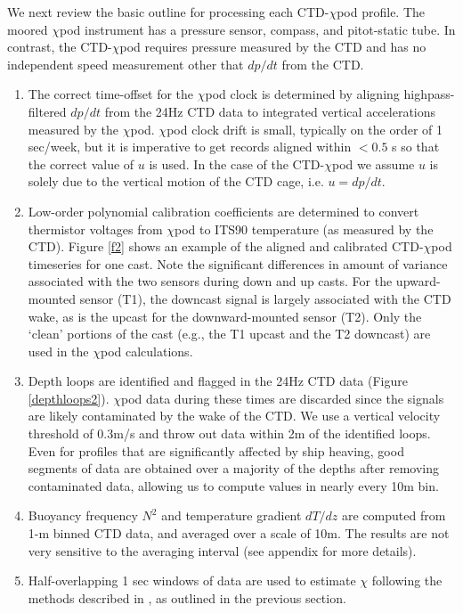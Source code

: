 \documentclass{ametsoc}
\begin{document}
We next review the basic outline for processing each CTD-$\chi$pod profile. The moored $\chi$pod instrument \citep{moumnash09} has a pressure sensor, compass, and pitot-static tube. In contrast, the CTD-$\chi$pod requires pressure measured by the CTD and has no independent speed measurement other that $dp/dt$ from the CTD.
\begin{enumerate}
\item The correct time-offset for the $\chi$pod clock is determined by aligning highpass-filtered $dp/dt$ from the 24Hz CTD data to  integrated vertical accelerations measured by the $\chi$pod. $\chi$pod clock drift is small, typically on the order of 1 sec/week, but it is imperative to get records aligned within $< 0.5$ s so that the correct value of $u$ is used. In the case of the CTD-$\chi$pod we assume $u$ is solely due to the vertical motion of the CTD cage, i.e. $u=dp/dt$.
\item Low-order polynomial calibration coefficients are determined to convert thermistor voltages from $\chi$pod to ITS90 temperature (as measured by
the CTD). Figure \ref{f2} shows an example of the aligned and calibrated CTD-$\chi$pod timeseries for one cast. Note the significant differences in amount of variance associated with the two sensors during down and up casts. For the upward-mounted sensor (T1), the downcast signal is largely associated with the CTD wake, as is the upcast for the downward-mounted sensor (T2). Only the `clean' portions of the cast (e.g., the T1 upcast and the T2 downcast) are used in the $\chi$pod calculations.
\item Depth loops are identified and flagged in the 24Hz CTD data (Figure \ref{depthloops2}). $\chi$pod data during these times are discarded since the signals are likely contaminated by the wake of the CTD. We use a vertical velocity threshold of $0.3$m/s and throw out data within 2m of the identified loops. Even for profiles that are significantly affected by ship heaving, good segments of data are obtained over a majority of the depths after removing contaminated data, allowing us to compute values in nearly every 10m bin. 
\item Buoyancy frequency $N^2$ and temperature gradient $dT/dz$ are computed from 1-m binned CTD data, and averaged over a scale of 10m. The results are not very sensitive to the averaging interval (see appendix for more details).
\item Half-overlapping 1 sec windows of data are used to estimate $\chi$ following the methods described in \cite{moumnash09}, as outlined in the previous section.
\end{enumerate}
\end{document}
